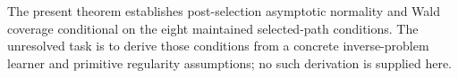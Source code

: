 The present theorem establishes post-selection asymptotic normality and Wald coverage conditional on the eight maintained selected-path conditions.  The unresolved task is to derive those conditions from a concrete inverse-problem learner and primitive regularity assumptions; no such derivation is supplied here.